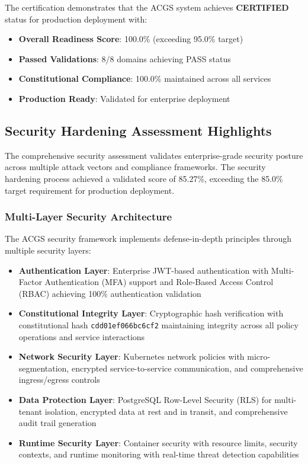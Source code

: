 The certification demonstrates that the ACGS system achieves \textbf{CERTIFIED} status for production deployment with:
\begin{itemize}[leftmargin=*,itemsep=1pt,parsep=1pt]
    \item \textbf{Overall Readiness Score}: 100.0\% (exceeding 95.0\% target)
    \item \textbf{Passed Validations}: 8/8 domains achieving PASS status
    \item \textbf{Constitutional Compliance}: 100.0\% maintained across all services
    \item \textbf{Production Ready}: Validated for enterprise deployment
\end{itemize}

\subsection{Security Hardening Assessment Highlights}
\label{subsec:security_hardening}

The comprehensive security assessment validates enterprise-grade security posture across multiple attack vectors and compliance frameworks. The security hardening process achieved a validated score of 85.27\%, exceeding the 85.0\% target requirement for production deployment.

\subsubsection{Multi-Layer Security Architecture}
The ACGS security framework implements defense-in-depth principles through multiple security layers:

\begin{itemize}[leftmargin=*,itemsep=2pt,parsep=1pt]
    \item \textbf{Authentication Layer}: Enterprise JWT-based authentication with Multi-Factor Authentication (MFA) support and Role-Based Access Control (RBAC) achieving 100\% authentication validation
    \item \textbf{Constitutional Integrity Layer}: Cryptographic hash verification with constitutional hash \texttt{cdd01ef066bc6cf2} maintaining integrity across all policy operations and service interactions
    \item \textbf{Network Security Layer}: Kubernetes network policies with micro-segmentation, encrypted service-to-service communication, and comprehensive ingress/egress controls
    \item \textbf{Data Protection Layer}: PostgreSQL Row-Level Security (RLS) for multi-tenant isolation, encrypted data at rest and in transit, and comprehensive audit trail generation
    \item \textbf{Runtime Security Layer}: Container security with resource limits, security contexts, and runtime monitoring with real-time threat detection capabilities
\end{itemize}

